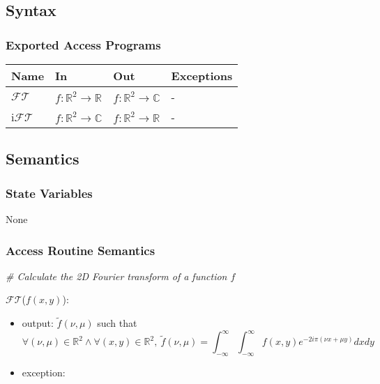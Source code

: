 \documentclass[12pt, titlepage]{article}
\begin{document}
\subsection{Syntax}

\subsubsection{Exported Access Programs}

\begin{center}
\begin{tabular}{p{2cm} p{4cm} p{4cm} p{2cm}}
\hline
\textbf{Name} & \textbf{In} & \textbf{Out} & \textbf{Exceptions} \\
\hline
$\mathcal{FT}$ & $f:\mathbb{R}^2\rightarrow\mathbb{R}$ & $f:\mathbb{R}^2\rightarrow\mathbb{C}$ & - \\
i$\mathcal{FT}$ & $f:\mathbb{R}^2\rightarrow\mathbb{C}$ & $f:\mathbb{R}^2\rightarrow\mathbb{R}$ & - \\
\hline
\end{tabular}
\end{center}

\subsection{Semantics}

\subsubsection{State Variables}
None

\subsubsection{Access Routine Semantics}

\noindent\textit{{\#} Calculate the 2D Fourier transform of a function $f$} \medskip

\noindent $\mathcal{FT}$($f(x,y)$):
\begin{itemize} 
\item output: $\widetilde{f}(\nu,\mu)$ such that 
\begin{equation*}
\forall (\nu,\mu) \in \mathbb{R}^2 \wedge \forall (x,y) \in \mathbb{R}^2, \ \widetilde{f}(\nu,\mu)=\int_{-\infty}^{\infty}\int_{-\infty}^{\infty}f(x,y)e^{-2i\pi(\nu x+\mu y)}dxdy
\end{equation*}
\item exception:  
\end{itemize}
\end{document}
